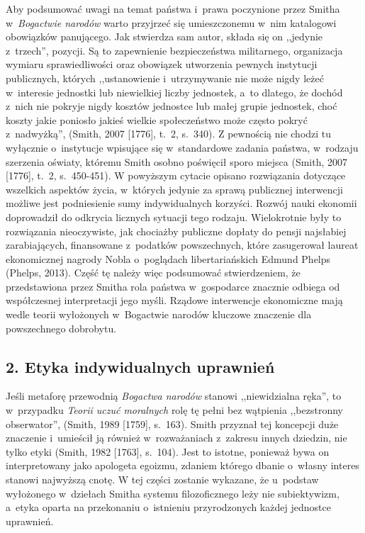 Aby podsumować uwagi na temat państwa i~prawa poczynione przez Smitha w~\textit{Bogactwie narodów} warto przyjrzeć się umieszczonemu w~nim katalogowi obowiązków panującego. Jak stwierdza sam autor, składa się on ,,jedynie z~trzech'', pozycji. Są to zapewnienie bezpieczeństwa militarnego, organizacja wymiaru sprawiedliwości oraz obowiązek utworzenia pewnych instytucji publicznych, których ,,ustanowienie i~utrzymywanie nie może nigdy leżeć w~interesie jednostki lub niewielkiej liczby jednostek, a~to dlatego, że dochód z~nich nie pokryje nigdy kosztów jednostce lub małej grupie jednostek, choć koszty jakie poniosło jakieś wielkie społeczeństwo może często pokryć z~nadwyżką'', \label{ref:RNDtabhicNFdT}(Smith, 2007 [1776], t.~2, s.~340). Z pewnością nie chodzi tu wyłącznie o~instytucje wpisujące się w~standardowe zadania państwa, w~rodzaju szerzenia oświaty, któremu Smith osobno poświęcił sporo miejsca \label{ref:RND91wqVhsg2n}(Smith, 2007 [1776], t.~2, s.~450-451). W powyższym cytacie opisano rozwiązania dotyczące wszelkich aspektów życia, w~których jedynie za sprawą publicznej interwencji możliwe jest podniesienie sumy indywidualnych korzyści. Rozwój nauki ekonomii doprowadził do odkrycia licznych sytuacji tego rodzaju. Wielokrotnie były to rozwiązania nieoczywiste, jak chociażby publiczne dopłaty do pensji najsłabiej zarabiających, finansowane z~podatków powszechnych, które zasugerował laureat ekonomicznej nagrody Nobla o~poglądach libertariańskich Edmund Phelps \label{ref:RNDa9f9c5iU52}(Phelps, 2013). Część tę należy więc podsumować stwierdzeniem, że przedstawiona przez Smitha rola państwa w~gospodarce znacznie odbiega od współczesnej interpretacji jego myśli. Rządowe interwencje ekonomiczne mają wedle teorii wyłożonych w~Bogactwie narodów kluczowe znaczenie dla powszechnego dobrobytu.

\subsection[2. Etyka indywidualnych uprawnień]{2. Etyka indywidualnych uprawnień}

Jeśli metaforę przewodnią \textit{Bogactwa narodów} stanowi ,,niewidzialna ręka'', to w~przypadku \textit{Teorii uczuć moralnych} rolę tę pełni bez wątpienia ,,bezstronny obserwator'', \label{ref:RNDkXOuGroqna}(Smith, 1989 [1759], s.~163). Smith przyznał tej koncepcji duże znaczenie i~umieścił ją również w~rozważaniach z~zakresu innych dziedzin, nie tylko etyki \label{ref:RND3u7VBrgecb}(Smith, 1982 [1763], s.~104). Jest to istotne, ponieważ bywa on interpretowany jako apologeta egoizmu, zdaniem którego dbanie o~własny interes stanowi najwyższą cnotę. W tej części zostanie wykazane, że u~podstaw wyłożonego w~dziełach Smitha systemu filozoficznego leży nie subiektywizm, a~etyka oparta na przekonaniu o~istnieniu przyrodzonych każdej jednostce uprawnień.

